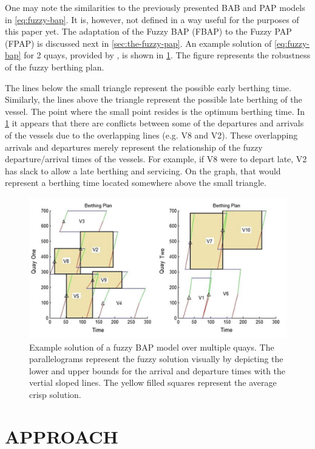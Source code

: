 \documentclass[ee,msthesis]{usuthesis}
\begin{document}
One may note the similarities to the previously presented BAB and PAP models in \ref{eq:fuzzy-bap}. It is, however, not
defined in a way useful for the purposes of this paper yet. The adaptation of the Fuzzy BAP (FBAP) to the Fuzzy PAP
(FPAP) is discussed next in \ref{sec:the-fuzzy-pap}. An example solution of \ref{eq:fuzzy-bap} for 2 quays, provided by
\cite{bello-2019-fuzzy-activ}, is shown in \ref{fig:bap-example-solution}. The figure represents the robustness of the fuzzy
berthing plan.

The lines below the small triangle represent the possible early berthing time. Similarly, the lines above the triangle
represent the possible late berthing of the vessel. The point where the small point resides is the optimum berthing
time. In \ref{fig:bap-example-solution} it appears that there are conflicts between some of the departures and arrivals of the
vessels due to the overlapping lines (e.g. V8 and V2). These overlapping arrivals and departures merely represent the
relationship of the fuzzy departure/arrival times of the vessels. For example, if V8 were to depart late, V2 has slack
to allow a late berthing and servicing. On the graph, that would represent a berthing time located somewhere above the
small triangle.

\begin{figure}[htbp]
\centering
\includegraphics[width=.9\linewidth]{img/bap-example-fuzzy-solution.png}
\caption{\label{fig:bap-example-solution}Example solution of a fuzzy BAP model over multiple quays. The parallelograms represent the fuzzy solution visually by depicting the lower and upper bounds for the arrival and departure times with the vertial sloped lines. The yellow filled squares represent the average crisp solution.}
\end{figure}
\chapter{APPROACH}
\label{sec:approach}
\end{document}
